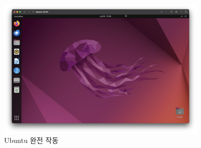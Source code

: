 \begin{figure}[htbp]
    \centering
    \includegraphics[width=0.9\textwidth]{images/chapter2Images/ch2_image_16.png}
    \caption{Ubuntu 완전 작동}
\end{figure}